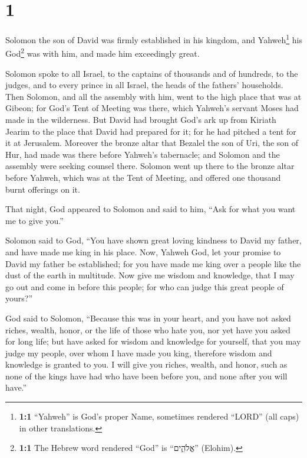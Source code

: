 \hypertarget{section}{%
\section{1}\label{section}}

 Solomon the son of David was firmly established in his
kingdom, and Yahweh\footnote{\textbf{1:1} ``Yahweh'' is God's proper
  Name, sometimes rendered ``LORD'' (all caps) in other translations.}
his God\footnote{\textbf{1:1} The Hebrew word rendered ``God'' is
  ``אֱלֹהִ֑ים'' (Elohim).} was with him, and made him exceedingly great.

 Solomon spoke to all Israel, to the captains of thousands
and of hundreds, to the judges, and to every prince in all Israel, the
heads of the fathers' households.  Then Solomon, and all
the assembly with him, went to the high place that was at Gibeon; for
God's Tent of Meeting was there, which Yahweh's servant Moses had made
in the wilderness.  But David had brought God's ark up
from Kiriath Jearim to the place that David had prepared for it; for he
had pitched a tent for it at Jerusalem.  Moreover the
bronze altar that Bezalel the son of Uri, the son of Hur, had made was
there before Yahweh's tabernacle; and Solomon and the assembly were
seeking counsel there.  Solomon went up there to the
bronze altar before Yahweh, which was at the Tent of Meeting, and
offered one thousand burnt offerings on it.

 That night, God appeared to Solomon and said to him,
``Ask for what you want me to give you.''

 Solomon said to God, ``You have shown great loving
kindness to David my father, and have made me king in his place.
 Now, Yahweh God, let your promise to David my father be
established; for you have made me king over a people like the dust of
the earth in multitude.  Now give me wisdom and
knowledge, that I may go out and come in before this people; for who can
judge this great people of yours?''

 God said to Solomon, ``Because this was in your heart,
and you have not asked riches, wealth, honor, or the life of those who
hate you, nor yet have you asked for long life; but have asked for
wisdom and knowledge for yourself, that you may judge my people, over
whom I have made you king,  therefore wisdom and
knowledge is granted to you. I will give you riches, wealth, and honor,
such as none of the kings have had who have been before you, and none
after you will have.''

